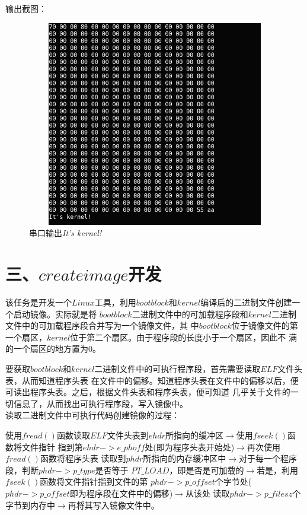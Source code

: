 \documentclass[UTF8,noindent]{ctexart}
\begin{document}
输出截图：
\begin{figure}[H]
	\centering\includegraphics[height = 9cm, width = 
	13cm]{fig/3.png}\caption{串口输出\emph{It's kernel!}}
\end{figure}

\section*{三、$createimage$开发}
该任务是开发一个$Linux$工具，利用$bootblock$和$kernel$编译后的二进制文件创建一个启动镜像。实际就是将
$bootblock$二进制文件中的可加载程序段和$kernel$二进制文件中的可加载程序段合并写为一个镜像文件，其
中$bootblock$位于镜像文件的第一个扇区，$kernel$位于第二个扇区。由于程序段的长度小于一个扇区，因此不
满的一个扇区的地方置为$0$。

要获取$bootblock$和$kernel$二进制文件中的可执行程序段，首先需要读取$ELF$文件头表，从而知道程序头表
在文件中的偏移。知道程序头表在文件中的偏移以后，便可读出程序头表。之后，根据文件头表和程序头表，便可知道
几乎关于文件的一切信息了，从而找出可执行程序段，写入镜像中。\\

读取二进制文件中可执行代码创建镜像的过程：

使用$fread()$函数读取$ELF$文件头表到$ehdr$所指向的缓冲区$\longrightarrow$使用$fseek()$函数将文件指针
指到第$ehdr->e\_phoff$处(即为程序头表开始处)$\longrightarrow$再次使用$fread()$函数将程序头表
读取到$phdr$所指向的内存缓冲区中$\longrightarrow$对于每一个程序段，判断$phdr->p\_type$是否等于
$PT\_LOAD$，即是否是可加载的$\longrightarrow$若是，利用$fseek()$函数将文件指针指到文件的第
$phdr->p\_offset$个字节处($phdr->p\_offset$即为程序段在文件中的偏移)$\longrightarrow$从该处
读取$phdr->p\_filesz$个字节到内存中$\longrightarrow$再将其写入镜像文件中。
\end{document}
